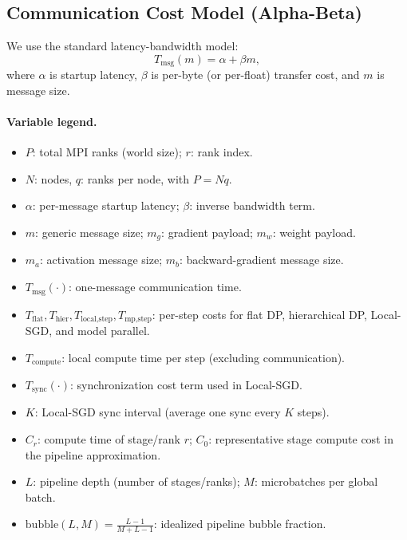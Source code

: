 \documentclass[11pt]{article}
\begin{document}
\FloatBarrier
\subsection{Communication Cost Model (Alpha-Beta)}
\label{sec:alpha-beta}
We use the standard latency-bandwidth model:
\begin{equation}
T_{\text{msg}}(m) = \alpha + \beta m,
\end{equation}
where \(\alpha\) is startup latency, \(\beta\) is per-byte (or per-float) transfer
cost, and \(m\) is message size.

\paragraph{Variable legend.}
\begin{itemize}[nosep]
  \item \(P\): total MPI ranks (world size); \(r\): rank index.
  \item \(N\): nodes, \(q\): ranks per node, with \(P = Nq\).
  \item \(\alpha\): per-message startup latency; \(\beta\): inverse bandwidth term.
  \item \(m\): generic message size; \(m_g\): gradient payload; \(m_w\): weight payload.
  \item \(m_a\): activation message size; \(m_b\): backward-gradient message size.
  \item \(T_{\text{msg}}(\cdot)\): one-message communication time.
  \item \(T_{\text{flat}}, T_{\text{hier}}, T_{\text{local,step}}, T_{\text{mp,step}}\): per-step costs for flat DP, hierarchical DP, Local-SGD, and model parallel.
  \item \(T_{\text{compute}}\): local compute time per step (excluding communication).
  \item \(T_{\text{sync}}(\cdot)\): synchronization cost term used in Local-SGD.
  \item \(K\): Local-SGD sync interval (average one sync every \(K\) steps).
  \item \(C_r\): compute time of stage/rank \(r\); \(C_0\): representative stage compute cost in the pipeline approximation.
  \item \(L\): pipeline depth (number of stages/ranks); \(M\): microbatches per global batch.
  \item \(\mathrm{bubble}(L,M)=\frac{L-1}{M+L-1}\): idealized pipeline bubble fraction.
\end{itemize}
\end{document}
